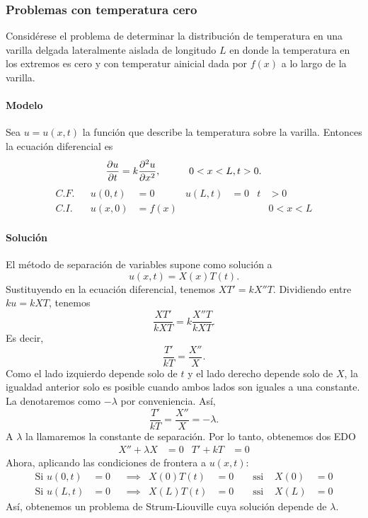 \documentclass[11pt,letterpaper,draft]{report}
\newcommand\<{\langle}
\renewcommand\>{\rangle}
\begin{document}
\subsubsection{Problemas con temperatura cero}
Considérese el problema de determinar la distribución de
temperatura en una varilla delgada lateralmente aislada de
longitudo $L$ en donde la temperatura en los extremos es cero y
con temperatur ainicial dada por $f(x)$ a lo largo de la varilla.

\paragraph{Modelo}
Sea $u=u(x,t)$ la función que describe la temperatura sobre la
varilla. Entonces la ecuación diferencial es
\[
  \frac{\partial u}{\partial t}
  = k
  \frac{\partial^2 u}{\partial x^2},
  \hspace{10mm} 0<x<L, t>0
.\]
\begin{align*}
  C.F. && u(0,t) &= 0 & u(L,t) &= 0 &t&>0 \\
  C.I. && u(x,0) &= f(x) & &&& 0<x<L
\end{align*}

\paragraph{Solución}
El método de separación de variables supone como solución a
\[
  u(x,t) = X(x)T(t)
.\]
Sustituyendo en la ecuación diferencial, tenemos $XT'=kX''T$.
Dividiendo entre $ku=kXT$, tenemos
\[
  \frac{XT'}{kXT} = k \frac{X''T}{kXT}
.\]
Es decir,
\[
  \frac{T'}{kT} = \frac{X''}{X}
.\]
Como el lado izquierdo depende solo de $t$ y el lado derecho
depende solo de $X$, la igualdad anterior solo es posible cuando
ambos lados son iguales a una constante. La denotaremos como
$-\lambda$ por conveniencia.
Así,
\[
  \frac{T'}{kT} = \frac{X''}{X} = -\lambda
.\]
A $\lambda$ la llamaremos la constante de separación.
Por lo tanto, obtenemos dos EDO
\begin{align*}
  X'' + \lambda X &= 0
  &
  T' + kT &= 0
\end{align*}
Ahora, aplicando las condiciones de frontera a $u(x,t)$:
\begin{align*}
  \text{Si } u(0,t)&=0
  & &\implies &
  X(0)T(t)&=0
  & &\text{ ssi } &
  X(0)&=0 \\
  \text{Si } u(L,t)&=0
  & &\implies &
  X(L)T(t)&=0
  & &\text{ ssi } &
  X(L)&=0
\end{align*}
Así, obtenemos un problema de Strum-Liouville cuya solución
depende de $\lambda$.
\end{document}
